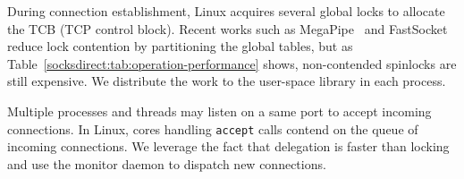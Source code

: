 During connection establishment, Linux acquires several global locks to allocate the TCB (TCP control block).
Recent works such as MegaPipe~\cite{han2012megapipe} and FastSocket~\cite{lin2016scalable} reduce lock contention by partitioning the global tables, but as Table~\ref{socksdirect:tab:operation-performance} shows, non-contended spinlocks are still expensive.
We distribute the work to the user-space library \libipc{} in each process.

Multiple processes and threads may listen on a same port to accept incoming connections.
In Linux, cores handling \texttt{accept} calls contend on the queue of incoming connections.
We leverage the fact that delegation is faster than locking~\cite{roghanchi2017ffwd} and use the monitor daemon to dispatch new connections.







